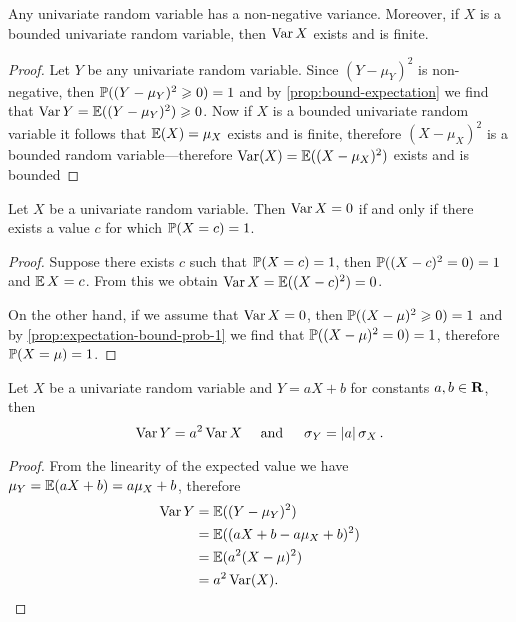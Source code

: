 \begin{proposition}
\label{prop:non-negative-variance}
Any univariate random variable has a non-negative variance. Moreover, if \(X\)
is a bounded univariate random variable, then \(\operatorname{Var} X\) exists and is finite.
\end{proposition}

\begin{proof}
Let \(Y\) be any univariate random variable. Since \((Y - \mu_Y)^2\) is
non-negative, then \(\operatorname{\mathbb{P}}((Y - \mu_Y)^2 \geqslant 0) = 1\) and by
\cref{prop:bound-expectation} we find that
\(\operatorname{Var} Y = \operatorname{\mathbb{E}}((Y - \mu_Y)^2) \geqslant 0\). Now if \(X\) is a bounded univariate
random variable it follows that \(\operatorname{\mathbb{E}}(X) = \mu_X\) exists and is finite,
therefore \((X - \mu_X)^2\) is a bounded random variable---therefore \(\operatorname{Var}(X) =
\operatorname{\mathbb{E}}((X - \mu_X)^2)\) exists and is bounded
\end{proof}

\begin{proposition}
\label{prop:variance-zero-iff-concentrated-in-single-value}
Let \(X\) be a univariate random variable. Then \(\operatorname{Var} X = 0\) if and only if
there exists a value \(c\) for which \(\operatorname{\mathbb{P}}(X = c) = 1\).
\end{proposition}

\begin{proof}
Suppose there exists \(c\) such that \(\operatorname{\mathbb{P}}(X = c) = 1\), then
\(\operatorname{\mathbb{P}}((X - c)^2 = 0) = 1\) and \(\operatorname{\mathbb{E}} X = c\). From this we obtain
\(\operatorname{Var} X = \operatorname{\mathbb{E}}((X - c)^2) = 0\).

On the other hand, if we assume that \(\operatorname{Var} X = 0\), then
\(\operatorname{\mathbb{P}}((X - \mu)^2 \geqslant 0) = 1\) and by \cref{prop:expectation-bound-prob-1} we find
that \(\operatorname{\mathbb{P}}((X - \mu)^2 = 0) = 1\), therefore \(\operatorname{\mathbb{P}}(X = \mu) = 1\).
\end{proof}

\begin{proposition}
\label{prop:variance-of-linear-combination}
Let \(X\) be a univariate random variable and \(Y = a X + b\) for constants \(a,
b \in \mathbf{R}\), then
\[
\operatorname{Var} Y = a^2 \operatorname{Var} X \quad \text{ and } \quad \operatorname{\sigma}_Y = |a| \operatorname{\sigma}_X.
\]
\end{proposition}

\begin{proof}
From the linearity of the expected value we have
\(\mu_Y = \operatorname{\mathbb{E}}(a X + b) = a \mu_X + b\), therefore
\begin{align*}
  \operatorname{Var} Y
  &= \operatorname{\mathbb{E}}((Y - \mu_Y)^2) \\
  &= \operatorname{\mathbb{E}}((a X + b - a \mu_X + b)^2) \\
  &= \operatorname{\mathbb{E}}(a^2 (X - \mu)^2) \\
  &= a^2 \operatorname{Var}(X).
\end{align*}
\end{proof}

